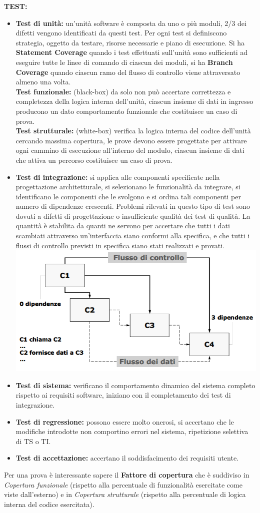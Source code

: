 \textbf{TEST:}
\begin{itemize}
	\item \textbf{Test di unità:} un'unità software è composta da uno o più moduli, 2/3 dei difetti vengono identificati da questi test. Per ogni test si definiscono strategia, oggetto da testare, risorse necessarie e piano di esecuzione. Si ha \textbf{Statement Coverage} quando i test effettuati sull'unità sono sufficienti ad eseguire tutte le linee di comando di ciascun dei moduli, si ha \textbf{Branch Coverage} quando ciascun ramo del flusso di controllo viene attraversato almeno una volta.\\
\textbf{Test funzionale:} (black-box) da solo non può accertare correttezza e completezza della logica interna dell'unità, ciascun insieme di dati in ingresso producono un dato comportamento funzionale che costituisce un caso di prova.\\
\textbf{Test strutturale:} (white-box) verifica la logica interna del codice dell'unità cercando massima copertura, le prove devono essere progettate per attivare ogni cammino di esecuzione all'interno del modulo, ciascun insieme di dati che attiva un percorso costituisce un caso di prova.
	\item \textbf{Test di integrazione:} si applica alle componenti specificate nella progettazione architetturale, si selezionano le funzionalità da integrare, si identificano le componenti che le svolgono e si ordina tali componenti per numero di dipendenze crescenti. Problemi rilevati in questo tipo di test sono dovuti a difetti di progettazione o insufficiente qualità dei test di qualità. La quantità è stabilita da quanti ne servono per accertare che tutti i dati scambiati attraverso un'interfaccia siano conformi alla specifica, e che tutti i flussi di controllo previsti in specifica siano stati realizzati e provati.
	\includegraphics[width=0.5\columnwidth]{img8}
	\item \textbf{Test di sistema:} verificano il comportamento dinamico del sistema completo rispetto ai requisiti software, iniziano con il completamento dei test di integrazione.
	\item \textbf{Test di regressione:} possono essere molto onerosi, si accertano che le modifiche introdotte non comportino errori nel sistema, ripetizione selettiva di TS o TI.
	\item \textbf{Test di accettazione:} accertano il soddisfacimento dei requisiti utente.
\end{itemize}
Per una prova è interessante sapere il \textbf{Fattore di copertura} che è suddiviso in \textit{Copertura funzionale} (rispetto alla percentuale di funzionalità esercitate come viste dall'esterno) e in \textit{Copertura strutturale} (rispetto alla percentuale di logica interna del codice esercitata). 
